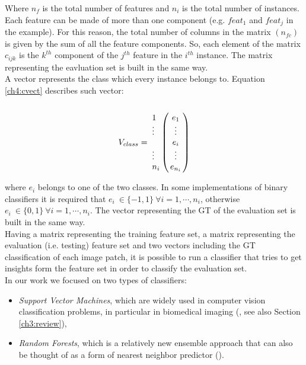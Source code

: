 Where $n_f$ is the total number of features and $n_i$ is the total number of instances. Each feature can be made of more than one component (e.g. $feat_1$ and $feat_j$ in the example).
For this reason, the total number of columns in the matrix $(n_{fc})$ is given by the sum of all the feature components. So, 
each element of the matrix $c_{ijk}$ is the $k^{th}$ component of the $j^{th}$ feature in the $i^{th}$ instance. The matrix representing the eavluation set is built in the same way.\\
A vector represents the class which every instance belongs to. Equation \ref{ch4:cvect} describes such vector:
\begin{equation}
\label{ch4:cvect}
 V_{class} = \\ \bordermatrix{~ &  ~  \cr
			      \tikzmark{varrowtop} 1 &  \tikzmark{f5} e_{1}  \tikzmark{f6} \cr
			                      \vdots & \vdots \cr
			                       ~     & e_i   \cr
			                      \vdots & \vdots \cr
			      \tikzmark{varrowbottom} n_i & e_{n_i} \cr
			     }
\end{equation}

where $e_i$ belongs to one of the two classes. In some implementations of binary classifiers it is required that $e_i \ \in \{-1,1\} \ \forall i = 1,\cdots,n_i$,
otherwise $e_i \ \in \{0,1\} \ \forall i = 1,\cdots,n_i$. The vector 
representing the \Gls{GT} of the evaluation set is built in the same way.\\
Having a matrix representing the training feature set, a matrix representing the evaluation (i.e. testing) feature set and two vectors including the \Gls{GT}
classification of each image patch, it is possible to run a classifier that tries to get insights form the feature set in order to classify the evaluation set.\\


In our work we focused on two types of classifiers:

\begin{itemize}
 \item \textit{Support Vector Machines}, which are widely used in computer vision classification problems, in particular
in biomedical imaging (\cite{mitosisDetectionLearningBased, SVM02, SVM03, SVMClassHistogram}, see also Section \ref{ch3:review}),
 \item \textit{Random Forests}, which is a relatively new ensemble approach that can also be thought of as a form of nearest neighbor predictor (\cite{randForests03,randForests02,randForests04}).
\end{itemize}

